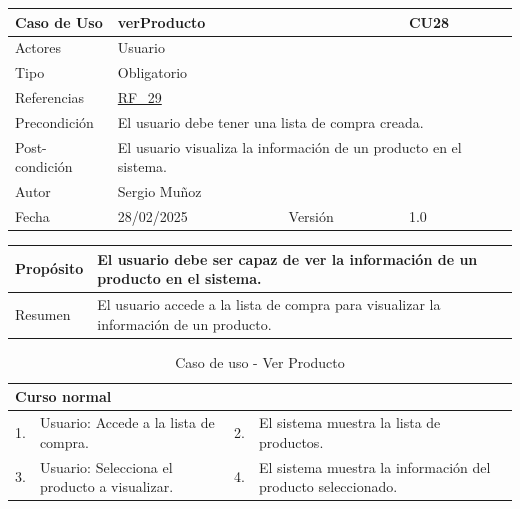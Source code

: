 \newpage

\begin{table}[H]
    \centering
    \begin{tabular}{| m{} | m{} | m{} | m{} |}
        \hline
        \rowcolor[HTML]{C0C0C0} Caso de Uso & \multicolumn{2}{|m{0.43\textwidth}|}{verProducto} &  CU28\\ 
        \hline
        Actores & \multicolumn{3}{l|}{Usuario} \\ 
        \hline
        Tipo & \multicolumn{3}{l|}{Obligatorio} \\ 
        \hline
        Referencias & \multicolumn{3}{l|}{\hyperref[req:RF29]{RF\_29}} \\ 
        \hline
        Precondición & \multicolumn{3}{m{0.67\textwidth}|}{El usuario debe tener una lista de compra creada.} \\ 
        \hline
        Post-condición & \multicolumn{3}{m{0.67\textwidth}|}{El usuario visualiza la información de un producto en el sistema.} \\ 
        \hline
        Autor & \multicolumn{3}{l|}{Sergio Muñoz} \\ 
        \hline
        Fecha & 28/02/2025 & Versión & 1.0 \\ 
        \hline
    \end{tabular}
\end{table}

\begin{table}[H]
    \centering
    \begin{tabular}{| m{} | m{} | m{} | m{} |}
        \hline
        Propósito & \multicolumn{3}{m{0.67\textwidth}|}{El usuario debe ser capaz de ver la información de un producto en el sistema.} \\ 
        \hline
        Resumen & \multicolumn{3}{m{0.67\textwidth}|}{El usuario accede a la lista de compra para visualizar la información de un producto.} \\ 
        \hline
    \end{tabular}
\end{table}

\begin{table}[H]
    \centering
    \begin{tabular}{| m{} | m{} | m{} | m{} |}
        \hline
        \multicolumn{4}{|m{0.9\textwidth}|}{Curso normal} \\ 
        \hline
        1. & Usuario: Accede a la lista de compra. 
        & 2. & El sistema muestra la lista de productos. \\ 
        \hline
        3. & Usuario: Selecciona el producto a visualizar. 
        & 4. & El sistema muestra la información del producto seleccionado. \\ 
        \hline
    \end{tabular}
    \caption{Caso de uso - Ver Producto}
\end{table}

